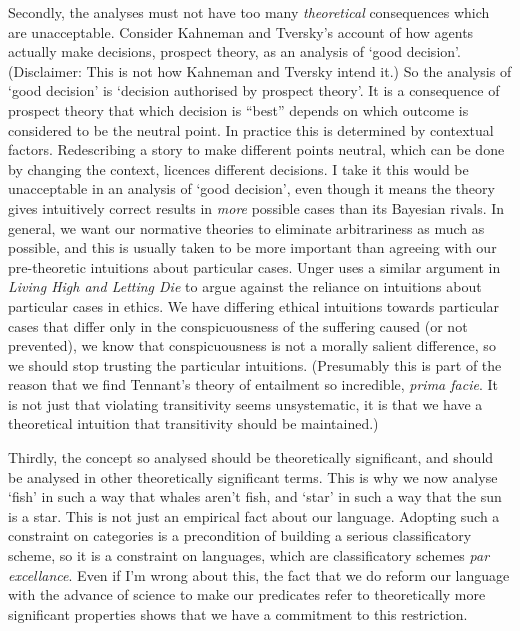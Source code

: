 \documentclass[
  11pt,
  letterpaper,
  DIV=11,
  numbers=noendperiod,
  oneside]{scrartcl}
\begin{document}
Secondly, the analyses must not have too many \emph{theoretical}
consequences which are unacceptable. Consider Kahneman and Tversky's
account of how agents actually make decisions, prospect theory, as an
analysis of `good decision'. (Disclaimer: This is not how Kahneman and
Tversky intend it.) So the analysis of `good decision' is `decision
authorised by prospect theory'. It is a consequence of prospect theory
that which decision is ``best'' depends on which outcome is considered
to be the neutral point. In practice this is determined by contextual
factors. Redescribing a story to make different points neutral, which
can be done by changing the context, licences different decisions. I
take it this would be unacceptable in an analysis of `good decision',
even though it means the theory gives intuitively correct results in
\emph{more} possible cases than its Bayesian rivals. In general, we want our
normative theories to eliminate arbitrariness as much as possible, and
this is usually taken to be more important than agreeing with our
pre-theoretic intuitions about particular cases. Unger uses a similar
argument in \emph{Living High and Letting Die} to argue against the
reliance on intuitions about particular cases in ethics. We have
differing ethical intuitions towards particular cases that differ only
in the conspicuousness of the suffering caused (or not prevented), we
know that conspicuousness is not a morally salient difference, so we
should stop trusting the particular intuitions. (Presumably this is part
of the reason that we find Tennant's theory of entailment so incredible,
\emph{prima facie}. It is not just that violating transitivity seems
unsystematic, it is that we have a theoretical intuition that
transitivity should be maintained.)

Thirdly, the concept so analysed should be theoretically significant,
and should be analysed in other theoretically significant terms. This is
why we now analyse `fish' in such a way that whales aren't fish, and
`star' in such a way that the sun is a star. This is not just an
empirical fact about our language. Adopting such a constraint on
categories is a precondition of building a serious classificatory
scheme, so it is a constraint on languages, which are classificatory
schemes \emph{par excellance}. Even if I'm wrong about this, the fact
that we do reform our language with the advance of science to make our
predicates refer to theoretically more significant properties shows that
we have a commitment to this restriction.
\end{document}
